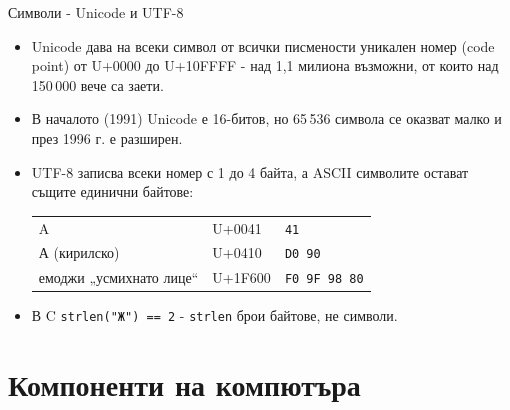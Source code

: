 \documentclass[14pt, aspectratio=169]{beamer}
\begin{document}
\begin{frame}{Символи - Unicode и UTF-8}
  \begin{itemize}
    \item Unicode дава на всеки символ от всички писмености уникален номер (code
      point) от U+0000 до U+10FFFF - над 1,1 милиона възможни, от които над
      150\,000 вече са заети.
    \item В началото (1991) Unicode е 16-битов, но 65\,536 символа се оказват
      малко и през 1996 г. е разширен.
    \item UTF-8 записва всеки номер с 1 до 4 байта, а ASCII символите остават
      същите единични байтове:
      \begin{center}
        \small
        \begin{tabular}{@{}lll@{}}
          A & U+0041 & \texttt{41} \\
          А (кирилско) & U+0410 & \texttt{D0 90} \\
          емоджи „усмихнато лице“ & U+1F600 & \texttt{F0 9F 98 80} \\
        \end{tabular}
      \end{center}
    \item В C \texttt{strlen("Ж") == 2} - \texttt{strlen} брои байтове, не
      символи.
  \end{itemize}
\end{frame}

\section{Компоненти на компютъра}
\end{document}
